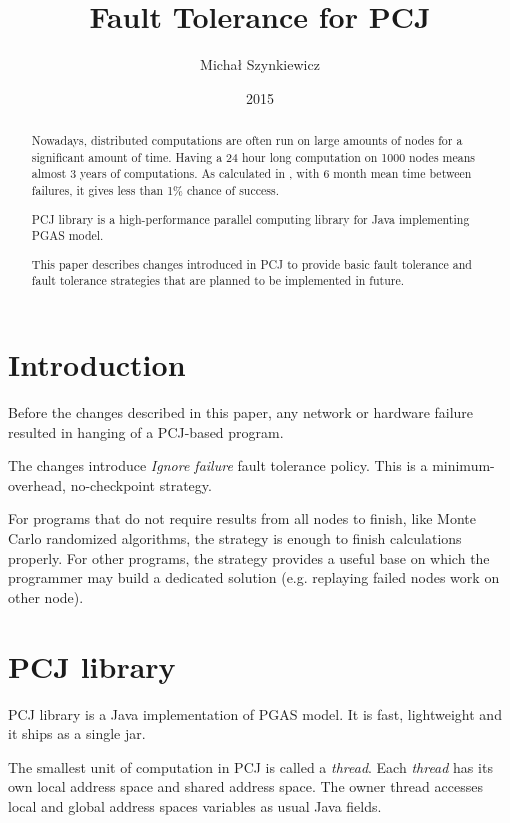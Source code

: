 \documentclass{llncs}
\begin{document}
\title{Fault Tolerance for PCJ}

\author{Michał Szynkiewicz}

\date{2015}
\maketitle

\begin{abstract}

Nowadays, distributed computations are often run on large amounts of nodes for a significant amount of time.
Having a 24 hour long computation on 1000 nodes means almost 3 years of computations.
As calculated in \cite{RX10}, with 6 month mean time between failures, it gives less than 1\% chance of success.

PCJ library is a high-performance parallel computing library for Java implementing PGAS model.

This paper describes changes introduced in PCJ to provide basic fault tolerance and fault tolerance strategies that are planned to be implemented in future.

\end{abstract}

\section{Introduction}
Before the changes described in this paper, any network or hardware failure resulted in hanging of a PCJ-based program.

The changes introduce \emph{Ignore failure} fault tolerance policy.
This is a minimum-overhead, no-checkpoint strategy.

For programs that do not require results from all nodes to finish, like Monte Carlo randomized algorithms, the strategy is enough to finish calculations properly.
For other programs, the strategy provides a useful base on which the programmer may build a dedicated solution (e.g. replaying failed nodes work on other node).


\section{PCJ library}
PCJ library is a Java implementation of PGAS model.
It is fast, lightweight and it ships as a single jar.

The smallest unit of computation in PCJ is called a \emph{thread}. Each \emph{thread} has its own local address space and shared address space.
The owner thread accesses local and global address spaces variables as usual Java fields.
\end{document}
